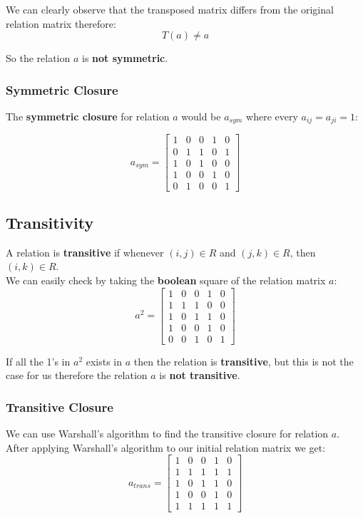 \documentclass[11pt]{article}
\begin{document}
We can clearly observe that the transposed matrix differs from the original relation matrix therefore:
\[
T(a) \neq a
\]

So the relation \(a\) is \textbf{not symmetric}.
\subsubsection{Symmetric Closure}
\label{sec:org0f13d67}
The \textbf{symmetric closure} for relation \(a\) would be \(a_{sym}\) where every \(a_{ij} = a_{ji} = 1\):

\[
a_{sym} =
 \begin{bmatrix}
 1 & 0 & 0 & 1 & 0 \\
 0 & 1 & 1 & 0 & 1 \\
 1 & 0 & 1 & 0 & 0 \\
 1 & 0 & 0 & 1 & 0 \\
 0 & 1 & 0 & 0 & 1
 \end{bmatrix}
\]
\subsection{Transitivity}
\label{sec:orgf3264cc}
A relation is \textbf{transitive} if whenever \((i,j) \in R\) and \((j, k) \in R\), then \((i,k) \in R\). \\
We can easily check by taking the \textbf{boolean} square of the relation matrix \(a\):
\[
a^2 =
 \begin{bmatrix}
 1 & 0 & 0 & 1 & 0 \\
 1 & 1 & 1 & 0 & 0 \\
 1 & 0 & 1 & 1 & 0 \\
 1 & 0 & 0 & 1 & 0 \\
 0 & 0 & 1 & 0 & 1
 \end{bmatrix}
\]

If all the 1's in \(a^2\) exists in \(a\) then the relation is \textbf{transitive}, but this is not the case for us therefore the relation \(a\) is \textbf{not transitive}.
\subsubsection{Transitive Closure}
\label{sec:orge972809}
We can use Warshall's algorithm to find the transitive closure for relation \(a\).
After applying Warshall's algorithm to our initial relation matrix we get:
\[
a_{trans} =
\begin{bmatrix}
1 & 0 & 0 & 1 & 0 \\
1 & 1 & 1 & 1 & 1 \\
1 & 0 & 1 & 1 & 0 \\
1 & 0 & 0 & 1 & 0 \\
1 & 1 & 1 & 1 & 1
\end{bmatrix}
\]
\end{document}
